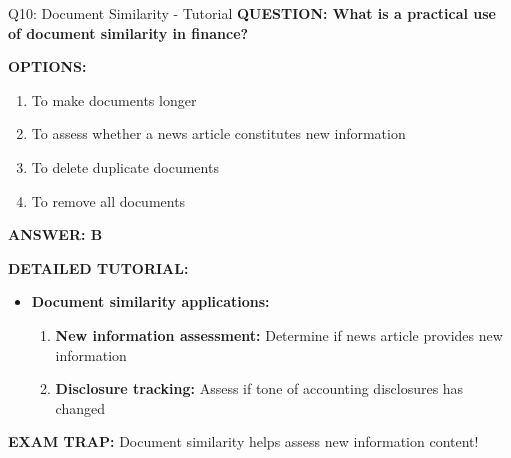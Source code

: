 \documentclass[8pt]{beamer}
\begin{document}
	\begin{frame}{Q10: Document Similarity - Tutorial}
		\fontsize{6.5}{7.5}\selectfont
		\textbf{QUESTION: What is a practical use of document similarity in finance?}
		
		\vspace{0.1cm}
		\textbf{OPTIONS:}
		\begin{enumerate}
			\item To make documents longer
			\item To assess whether a news article constitutes new information
			\item To delete duplicate documents
			\item To remove all documents
		\end{enumerate}
		
		\vspace{0.1cm}
		\textcolor{myblue}{\textbf{ANSWER: B}}
		
		\vspace{0.1cm}
		\textbf{DETAILED TUTORIAL:}
		\begin{itemize}
			\item \textbf{Document similarity applications:}
			\begin{enumerate}
				\item \textbf{New information assessment:} Determine if news article provides new information
				\item \textbf{Disclosure tracking:} Assess if tone of accounting disclosures has changed
			\end{enumerate}
		\end{itemize}
		
		\textcolor{myred}{\textbf{EXAM TRAP:}} Document similarity helps assess \textcolor{myblue}{new information content}!
	\end{frame}
	
	
\end{document}
